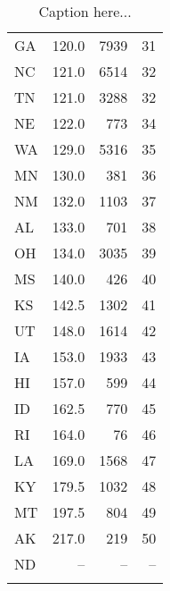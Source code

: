 \begin{longtable}{lrrr}
GA    &   120.0 &   7939 &    31 \\
NC    &   121.0 &   6514 &    32 \\
TN    &   121.0 &   3288 &    32 \\
NE    &   122.0 &    773 &    34 \\
WA    &   129.0 &   5316 &    35 \\
MN    &   130.0 &    381 &    36 \\
NM    &   132.0 &   1103 &    37 \\
AL    &   133.0 &    701 &    38 \\
OH    &   134.0 &   3035 &    39 \\
MS    &   140.0 &    426 &    40 \\
KS    &   142.5 &   1302 &    41 \\
UT    &   148.0 &   1614 &    42 \\
IA    &   153.0 &   1933 &    43 \\
HI    &   157.0 &    599 &    44 \\
ID    &   162.5 &    770 &    45 \\
RI    &   164.0 &     76 &    46 \\
LA    &   169.0 &   1568 &    47 \\
KY    &   179.5 &   1032 &    48 \\
MT    &   197.5 &    804 &    49 \\
AK    &   217.0 &    219 &    50 \\
ND    &      -- &     -- &    -- \\
        \caption{Caption here...}
        \label{tab:label_here}
\end{longtable}
